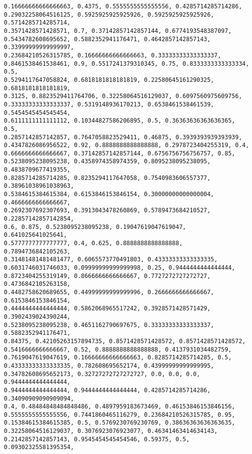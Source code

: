 \documentclass[11pt]{article}
\begin{document}
\begin{Verbatim}[commandchars=\\\{\}]
0.16666666666666663, 0.4375, 0.5555555555555556, 0.4285714285714286,
0.29032258064516125, 0.5925925925925926, 0.5925925925925926, 0.5714285714285714,
0.3571428571428571, 0.7, 0.37142857142857144, 0.6774193548387097,
0.5434782608695652, 0.5882352941176471, 0.4642857142857143, 0.33999999999999997,
0.23684210526315785, 0.16666666666666663, 0.33333333333333337,
0.8461538461538461, 0.9, 0.5517241379310345, 0.75, 0.8333333333333334, 0.5,
0.5294117647058824, 0.6818181818181819, 0.22580645161290325, 0.6818181818181819,
0.3125, 0.8823529411764706, 0.32258064516129037, 0.6097560975609756,
0.33333333333333337, 0.5319148936170213, 0.6538461538461539, 0.5454545454545454,
0.6111111111111112, 0.10344827586206895, 0.5, 0.36363636363636365, 0.5,
0.2857142857142857, 0.7647058823529411, 0.46875, 0.3939393939393939,
0.4347826086956522, 0.92, 0.8888888888888888, 0.2978723404255319, 0.4,
0.6666666666666667, 0.37142857142857144, 0.6756756756756757, 0.85,
0.5238095238095238, 0.4358974358974359, 0.8095238095238095, 0.4838709677419355,
0.8285714285714285, 0.8235294117647058, 0.7540983606557377, 0.38961038961038963,
0.5384615384615384, 0.6153846153846154, 0.30000000000000004, 0.4666666666666667,
0.2692307692307693, 0.3913043478260869, 0.5789473684210527, 0.22857142857142854,
0.6, 0.875, 0.5238095238095238, 0.19047619047619047, 0.641025641025641,
0.5777777777777777, 0.4, 0.625, 0.8888888888888888, 0.7894736842105263,
0.31481481481481477, 0.6065573770491803, 0.43333333333333335,
0.6031746031746033, 0.09999999999999998, 0.25, 0.9444444444444444,
0.8723404255319149, 0.8666666666666667, 0.7727272727272727, 0.4736842105263158,
0.4482758620689655, 0.44999999999999996, 0.2666666666666667, 0.6153846153846154,
0.4444444444444444, 0.5862068965517242, 0.3928571428571429, 0.3902439024390244,
0.5238095238095238, 0.4651162790697675, 0.33333333333333337, 0.5882352941176471,
0.84375, 0.42105263157894735, 0.8571428571428572, 0.8571428571428572,
0.5416666666666667, 0.52, 0.8888888888888888, 0.4137931034482759,
0.7619047619047619, 0.16666666666666663, 0.8285714285714285, 0.5,
0.43333333333333335, 0.782608695652174, 0.43999999999999995,
0.34782608695652173, 0.32727272727272727, 0.0, 0.0, 0.0, 0.9444444444444444,
0.9444444444444444, 0.9444444444444444, 0.4285714285714286, 0.34090909090909094,
0.4, 0.48484848484848486, 0.4897959183673469, 0.46153846153846156,
0.5555555555555556, 0.7441860465116279, 0.23684210526315785, 0.95,
0.15384615384615385, 0.5, 0.5769230769230769, 0.38636363636363635,
0.32258064516129037, 0.3076923076923077, 0.46341463414634143,
0.2142857142857143, 0.9545454545454546, 0.59375, 0.5, 0.09302325581395354,

\end{Verbatim}
\end{document}

